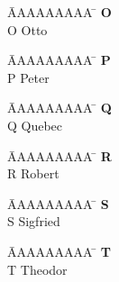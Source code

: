 \vspace*{-1.5cm}
\begin{tabbing}
	\hspace{0.0cm}  \= AAAAAAAAA \=       \hspace{2cm} \kill
	\>\textbf{O} 	\> \\
	\>O 			\>  Otto\\
\end{tabbing}

\vspace*{-1.5cm}
\begin{tabbing}
	\hspace{0.0cm}  \= AAAAAAAAA \=       \hspace{2cm} \kill
	\>\textbf{P} 	\> \\
	\>P 			\>  Peter\\
\end{tabbing}

\vspace*{-1.5cm}
\begin{tabbing}
	\hspace{0.0cm}  \= AAAAAAAAA \=       \hspace{2cm} \kill
	\>\textbf{Q} 	\> \\
	\>Q 			\>  Quebec\\
\end{tabbing}

\vspace*{-1.5cm}
\begin{tabbing}
	\hspace{0.0cm}  \= AAAAAAAAA \=       \hspace{2cm} \kill
	\>\textbf{R} 	\> \\
	\>R 			\>  Robert\\
\end{tabbing}

\vspace*{-1.5cm}
\begin{tabbing}
	\hspace{0.0cm}  \= AAAAAAAAA \=       \hspace{2cm} \kill
	\>\textbf{S} 	\> \\
	\>S 			\>  Sigfried\\
\end{tabbing}

\vspace*{-1.5cm}
\begin{tabbing}
	\hspace{0.0cm}  \= AAAAAAAAA \=       \hspace{2cm} \kill
	\>\textbf{T} 	\> \\
	\>T 			\>  Theodor\\
\end{tabbing}

